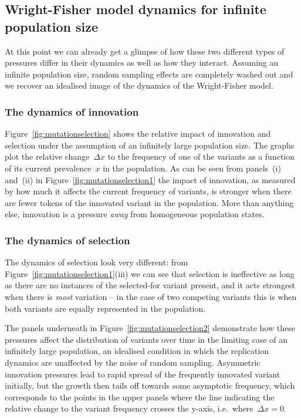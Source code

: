 \subsection{Wright-Fisher model dynamics for infinite population size}

At this point we can already get a glimpse of how these two different types of pressures differ in their dynamics as well as how they interact. Assuming an infinite population size, random sampling effects are completely washed out and we recover an idealised image of the dynamics of the Wright-Fisher model.

\subsubsection{The dynamics of innovation}

Figure~\ref{fig:mutationselection} shows the relative impact of innovation and selection under the assumption of an infinitely large population size. The graphs plot the relative change~$\Delta x$ to the frequency of one of the variants as a function of its current prevalence~$x$ in the population. As can be seen from panels~(i) and~(ii) in Figure~\ref{fig:mutationselection1} the impact of innovation, as measured by how much it affects the current frequency of variants, is stronger when there are fewer tokens of the innovated variant in the population. More than anything else, innovation is a pressure \emph{away} from homogeneous population states.

\subsubsection{The dynamics of selection}

The dynamics of selection look very different: from Figure~\ref{fig:mutationselection1}(iii) we can see that selection is ineffective as long as there are no instances of the selected-for variant present, and it acts strongest when there is \emph{most} variation -- in the case of two competing variants this is when both variants are equally represented in the population.

The panels underneath in Figure~\ref{fig:mutationselection2} demonstrate how these pressures affect the distribution of variants over time in the limiting case of an infinitely large population, an idealised condition in which the replication dynamics are unaffected by the noise of random sampling. Asymmetric innovation pressures lead to rapid spread of the frequently innovated variant initially, but the growth then tails off towards some asymptotic frequency, which corresponds to the points in the upper panels where the line indicating the relative change to the variant frequency crosses the y-axis, i.e.~where~$\Delta x=0$.


